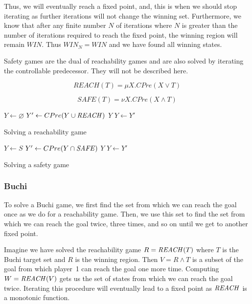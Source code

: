 Thus, we will eventually reach a fixed point, and, this is when we should stop iterating as further iterations will not change the winning set. Furthermore, we know that after any finite number $N$ of iterations where $N$ is greater than the number of iterations required to reach the fixed point, the winning region will remain $WIN$. Thus $WIN_N = WIN$ and we have found all winning states.

Safety games are the dual of reachability games and are also solved by iterating the controllable predecessor. They will not be described here.

\begin{equation}
    \mathit{REACH}(T) = \mu X. CPre(X \vee T)
\label{equ:mu_reach}
\end{equation}

\begin{equation}
\mathit{SAFE}(T) = \nu X. CPre(X \wedge T)
\label{equ:mu_safe}
\end{equation}

\begin{algorithm}[t]
\begin{algorithmic}
\State $Y \gets \varnothing$
\Loop
\State $Y' \gets CPre(Y \cup \mathit{REACH})$
\State\Return $Y$\EndIf
\State $Y \gets Y'$
\EndLoop
\EndFunction
\end{algorithmic}
\caption{Solving a reachability game}
\label{a:reach}
\end{algorithm}

\begin{algorithm}[t]
\begin{algorithmic}
\State $Y \gets S$
\Loop
\State $Y' \gets CPre(Y \cap \mathit{SAFE})$
\State\Return $Y$\EndIf
\State $Y \gets Y'$
\EndLoop
\EndFunction
\end{algorithmic}
\caption{Solving a safety game}
\label{a:safe}
\end{algorithm}

\subsubsection{Buchi}

To solve a Buchi game, we first find the set from which we can reach the goal once as we do for a reachability game. Then, we use this set to find the set from which we can reach the goal twice, three times, and so on until we get to another fixed point. 

Imagine we have solved the reachability game $R = \mathit{REACH}(T)$ where $T$ is the Buchi target set and $R$ is the winning region. Then $V = R \wedge T$ is a subset of the goal from which player~1 can reach the goal one more time. Computing $W = \mathit{REACH}(V)$ gets us the set of states from which we can reach the goal twice. Iterating this procedure will eventually lead to a fixed point as $\mathit{REACH}$ is a monotonic function.

